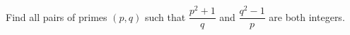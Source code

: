 Find all pairs of primes \((p,q)\) such that \(\dfrac{p^2+1}{q}\) and \(\dfrac{q^2-1}{p}\) are both integers.
